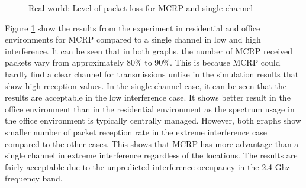 
\begin{figure}
\centering
{}
\caption{Real world: Level of packet loss for MCRP and single channel}
\label{fig:hardware}
\end{figure}

Figure \ref{fig:hardware} show the results from the experiment in residential and office environments for MCRP compared to a single channel in low and high interference. It can be seen that in both graphs, the number of MCRP received packets vary from approximately 80\% to 90\%. This is because MCRP could hardly find a clear channel for transmissions unlike in the simulation results that show high reception values.
In the single channel case, it can be seen that the results are acceptable in the low interference case. It shows better result in the office environment than in the residential environment as the spectrum usage in the office environment is typically centrally managed. However, both graphs show smaller number of packet reception rate in the extreme interference case compared to the other cases. This shows that MCRP has more advantage than a single channel in extreme interference regardless of the locations. The results are fairly acceptable due to the unpredicted interference occupancy in the 2.4 Ghz frequency band.



